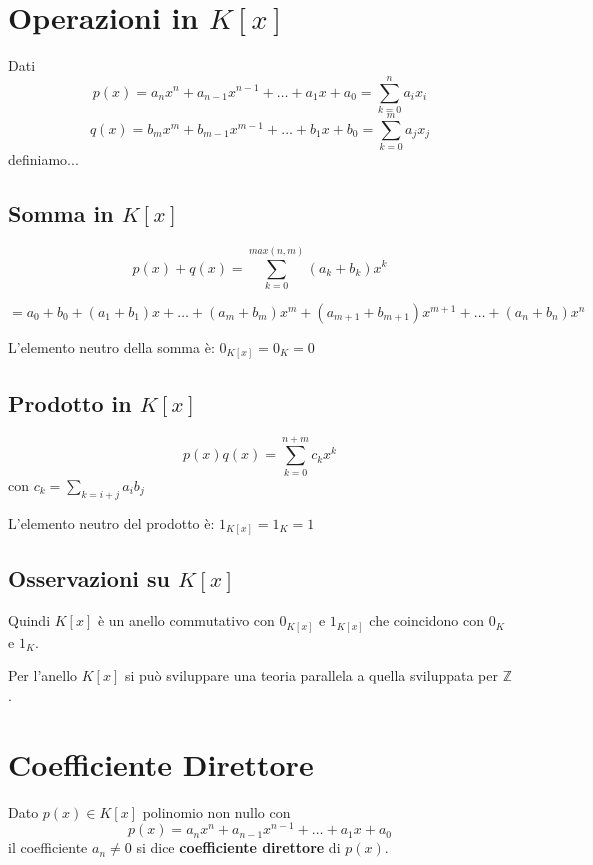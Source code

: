 \documentclass[a4paper,12pt, oneside]{book}
\begin{document}
\section{Operazioni in $K[x]$}
Dati
$$p(x) = a_{n}x^{n} + a_{n-1}x^{n-1} + \dots + a_{1}x + a_{0} = \sum_{k=0}^{n} a_i x_i$$
$$q(x) = b_{m}x^{m} + b_{m-1}x^{m-1} + \dots + b_{1}x + b_{0} = \sum_{k=0}^{m} a_j x_j$$
definiamo...
\subsection{Somma in $K[x]$}
$$p(x)+q(x) = \sum_{k=0}^{max(n,m)} (a_k+b_k)x^k$$

$$= a_0 + b_0 + (a_1+b_1)x + \dots + (a_m+b_m)x^m + (a_{m+1}+b_{m+1})x^{m+1} + \dots + (a_n+b_n)x^n$$

\begin{nota}
	L'elemento neutro della somma è: $0_{K[x]} = 0_K = 0$
\end{nota}

\subsection{Prodotto in $K[x]$}
$$p(x)q(x) = \sum_{k=0}^{n+m} c_kx^k$$
con $c_k = \displaystyle\sum_{k=i+j} a_ib_j$

\begin{nota}
	L'elemento neutro del prodotto è: $1_{K[x]} = 1_K = 1$
\end{nota}

\subsection{Osservazioni su $K[x]$}

\begin{nota}
	Quindi $K[x]$ è un anello commutativo con $0_{K[x]}$ e $1_{K[x]}$ che coincidono con $0_K$ e $1_K$.
\end{nota}

\begin{nota}
	Per l'anello $K[x]$ si può sviluppare una teoria parallela a quella sviluppata per $\mathbb{Z}$.
\end{nota}

\section{Coefficiente Direttore}
\begin{definizione}
	Dato $p(x) \in K[x]$ polinomio non nullo con
	$$p(x) = a_{n}x^{n} + a_{n-1}x^{n-1} + \dots + a_{1}x + a_{0}$$
	il coefficiente $a_n \not = 0$ si dice \textbf{coefficiente direttore} di $p(x)$.
\end{definizione}
\end{document}
